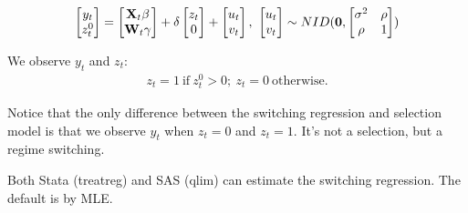 \begin{equation}
\begin{bmatrix}
y_t \\ z_t^0
\end{bmatrix}
=\begin{bmatrix} {\bf X}_t \beta \\ {\bf W}_t \gamma
\end{bmatrix}+ \delta \begin{bmatrix} {z_t} \\ 0
\end{bmatrix} +
\begin{bmatrix} u_t \\ v_t
\end{bmatrix}, \
\begin{bmatrix} u_t \\ v_t
\end{bmatrix} \sim NID({\bf 0},
\begin{bmatrix} \sigma^2 & \rho  \\ \rho  & 1
\end{bmatrix})
\end{equation}

We observe $y_t$ and $z_t$:
\begin{eqnarray}
  z_t  =  1  \ \mbox{if} \ z_t^0 > 0; \ z_t=0 \ \mbox{otherwise}.
\end{eqnarray}

Notice that the only difference between the switching regression and
selection model is that we observe $y_t$ when $z_t=0$ and $z_t=1$.
It's not a selection, but a regime switching.

Both Stata (treatreg) and SAS (qlim) can estimate the switching
regression.  The default is by MLE.
